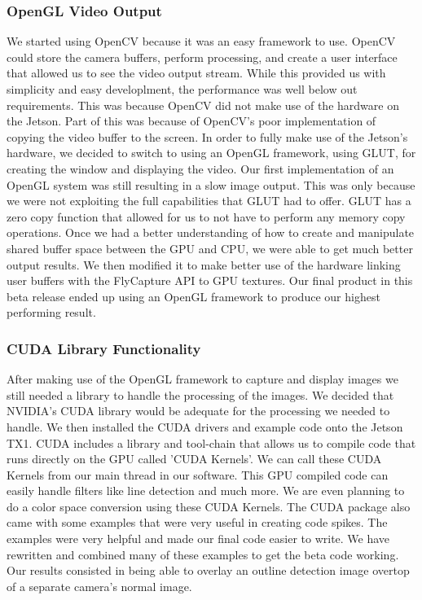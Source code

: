 \documentclass[letterpaper,10pt,titlepage]{IEEEtran}
\begin{document}
   \subsubsection{OpenGL Video Output}
	We started using OpenCV because it was an easy framework to use. OpenCV could store the camera buffers, perform processing, and create a user interface that allowed us to see the video output stream. While this provided us with simplicity and easy developlment, the performance was well below out requirements. This was because OpenCV did not make use of the hardware on the Jetson. Part of this was because of OpenCV's poor implementation of copying the video buffer to the screen. In order to fully make use of the Jetson's hardware, we decided to switch to using an OpenGL framework, using GLUT, for creating the window and displaying the video. Our first implementation of an OpenGL system was still resulting in a slow image output. This was only because we were not exploiting the full capabilities that GLUT had to offer. GLUT has a zero copy function that allowed for us to not have to perform any memory copy operations. Once we had a better understanding of how to create and manipulate shared buffer space between the GPU and CPU, we were able to get much better output results. We then modified it to make better use of the hardware linking user buffers with the FlyCapture API to GPU textures. Our final product in this beta release ended up using an OpenGL framework to produce our highest performing result.\\

  \subsubsection{CUDA Library Functionality}
   After making use of the OpenGL framework to capture and display images we still needed a library to handle the processing of the images. We decided that NVIDIA's CUDA library would be adequate for the processing we needed to handle. We then installed the CUDA drivers and example code onto the Jetson TX1. CUDA includes a library and tool-chain that allows us to compile code that runs directly on the GPU called 'CUDA Kernels'. We can call these CUDA Kernels from our main thread in our software. This GPU compiled code can easily handle filters like line detection and much more. We are even planning to do a color space conversion using these CUDA Kernels. The CUDA package also came with some examples that were very useful in creating code spikes. The examples were very helpful and made our final code easier to write. We have rewritten and combined many of these examples to get the beta code working. Our results consisted in being able to overlay an outline detection image overtop of a separate camera's normal image.\\
\end{document}
